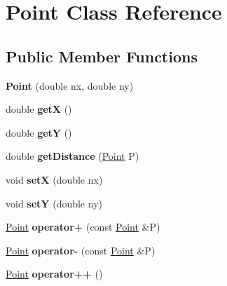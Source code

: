 \hypertarget{class_point}{}\section{Point Class Reference}
\label{class_point}
\subsection*{Public Member Functions}
\begin{DoxyCompactItemize}
\item 
\mbox{\label{class_point_ac48df7076af6d62f06c83dec7210af6f}} 
{\bfseries Point} (double nx, double ny)
\item 
\mbox{\label{class_point_a8de35a6098cdd7267b4167776da83da6}} 
double {\bfseries getX} ()
\item 
\mbox{\label{class_point_aa278c8bcb8aeb4101023a4baf473b547}} 
double {\bfseries getY} ()
\item 
\mbox{\label{class_point_ab39ccecf6fefd96519e824627cc19dcc}} 
double {\bfseries get\+Distance} (\mbox{\hyperlink{class_point}{Point}} P)
\item 
\mbox{\label{class_point_a62436e2678bfd0a4be0e2729c9d60380}} 
void {\bfseries setX} (double nx)
\item 
\mbox{\label{class_point_a3611975b72fc2279dc91653237bd3cd5}} 
void {\bfseries setY} (double ny)
\item 
\mbox{\label{class_point_a02630b584fbba1c36824aff202ef0438}} 
\mbox{\hyperlink{class_point}{Point}} {\bfseries operator+} (const \mbox{\hyperlink{class_point}{Point}} \&P)
\item 
\mbox{\label{class_point_a57f06b78cf85afb8af8fb10c814400ab}} 
\mbox{\hyperlink{class_point}{Point}} {\bfseries operator-\/} (const \mbox{\hyperlink{class_point}{Point}} \&P)
\item 
\mbox{\label{class_point_a8ceaa4c72b0d4ace6ac0c1ff4501ae6b}} 
\mbox{\hyperlink{class_point}{Point}} {\bfseries operator++} ()
\item 

\end{DoxyCompactItemize}

